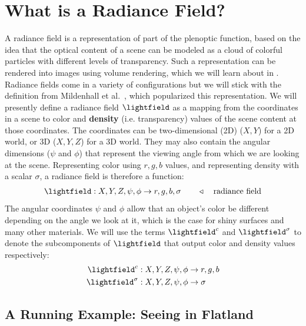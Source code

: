 \section{What is a Radiance Field?}
A radiance field is a representation of part of the plenoptic function, based on the idea that the optical content of a scene can be modeled as a cloud of colorful particles with different levels of transparency. Such a representation can be rendered into images using volume rendering, which we will learn about in \sect{\ref{sec:nerfs:volume_rendering}}. Radiance fields come in a variety of configurations but we will stick with the definition from Mildenhall et al.~\cite{mildenhall2020nerf}, which popularized this representation. We will presently define a radiance field $\lightfield$ as a mapping from the coordinates in a scene to color and \textbf{density} (i.e. transparency) values of the scene content at those coordinates. The coordinates can be two-dimensional (2D) ($X,Y$) for a 2D world, or 3D ($X,Y,Z$) for a 3D world. They may also contain the angular dimensions ($\psi$ and $\phi$) that represent the viewing angle from which we are looking at the scene. Representing color using $r,g,b$ values, and representing density with a scalar $\sigma$, a radiance field is therefore a function:%
\begin{align}
    \lightfield: X,Y,Z,\psi,\phi \rightarrow r,g,b,\sigma \quad\quad\triangleleft \quad\text{radiance field}
\end{align}
The angular coordinates $\psi$ and $\phi$ allow that an object's color be different depending on the angle we look at it, which is the case for shiny surfaces and many other materials. We will use the terms $\lightfield^c$ and $\lightfield^\sigma$ to denote the subcomponents of $\lightfield$ that output color and density values respectively:
\begin{align}
    \lightfield^c        & : X,Y,Z,\psi,\phi \rightarrow r,g,b \\
    \lightfield^{\sigma} & : X,Y,Z,\psi,\phi \rightarrow\sigma
\end{align}

\subsection{A Running Example: Seeing in Flatland}

